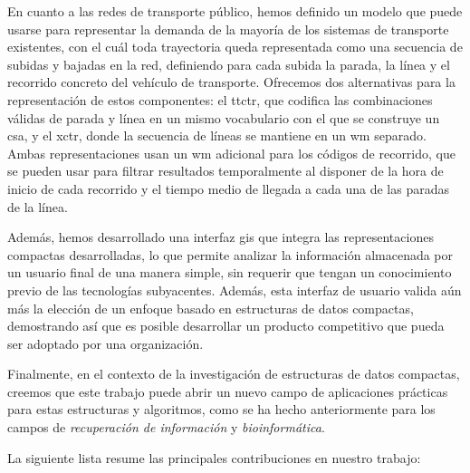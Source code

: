     En cuanto a las redes de transporte p\'ublico, hemos definido un modelo que puede usarse para representar la demanda de la mayor\'ia de los sistemas de transporte existentes, con el cu\'al toda trayectoria queda representada como una secuencia de subidas y bajadas en la red, definiendo para cada subida la parada, la l\'inea y el recorrido concreto del veh\'iculo de transporte. Ofrecemos dos alternativas para la representaci\'on de estos componentes: el \gls{ttctr}, que codifica las combinaciones v\'alidas de parada y l\'inea en un mismo vocabulario con el que se construye un \gls{csa}, y el \gls{xctr}, donde la secuencia de l\'ineas se mantiene en un \gls{wm} separado. Ambas representaciones usan un \gls{wm} adicional para los c\'odigos de recorrido, que se pueden usar para filtrar resultados temporalmente al disponer de la hora de inicio de cada recorrido y el tiempo medio de llegada a cada una de las paradas de la l\'inea. 

    
    Adem\'as, hemos desarrollado una interfaz \gls{gis} que integra las representaciones compactas desarrolladas, lo que permite analizar la informaci\'on almacenada por un usuario final de una manera simple, sin requerir que tengan un conocimiento previo de las tecnolog\'ias subyacentes. Adem\'as, esta interfaz de usuario valida a\'un m\'as la elecci\'on de un enfoque basado en estructuras de datos compactas, demostrando as\'i que es posible desarrollar un producto competitivo que pueda ser adoptado por una organizaci\'on.
    
    Finalmente, en el contexto de la investigaci\'on de estructuras de datos compactas, creemos que este trabajo puede abrir un nuevo campo de aplicaciones pr\'acticas para estas estructuras y algoritmos, como se ha hecho anteriormente para los campos de \textit{recuperaci\'on de informaci\'on} y \textit{bioinform\'atica}.

    La siguiente lista resume las principales contribuciones en nuestro trabajo:

